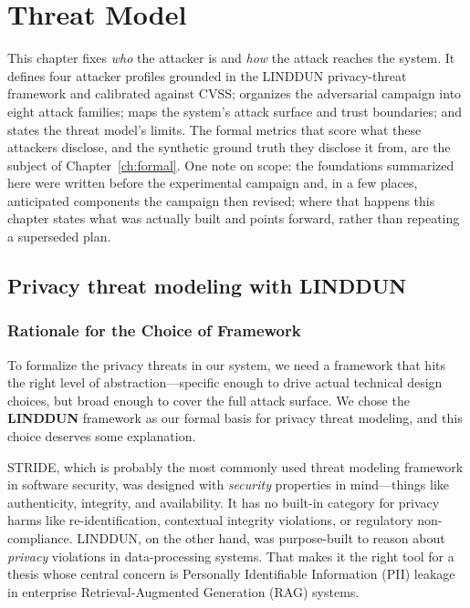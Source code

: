 \chapter{Threat Model}
\label{ch:threat}

This chapter fixes \emph{who} the attacker is and \emph{how} the attack reaches the system. It
defines four attacker profiles grounded in the LINDDUN privacy-threat framework and calibrated
against CVSS; organizes the adversarial campaign into eight attack families; maps the system's
attack surface and trust boundaries; and states the threat model's limits. The formal metrics
that score what these attackers disclose, and the synthetic ground truth they disclose it from,
are the subject of Chapter~\ref{ch:formal}. One note on scope: the foundations summarized here
were written before the experimental campaign and, in a few places, anticipated components the
campaign then revised; where that happens this chapter states what was actually built and points
forward, rather than repeating a superseded plan.

\section{Privacy threat modeling with LINDDUN}
\label{sec:ch3-linddun}

\subsection{Rationale for the Choice of Framework}

To formalize the privacy threats in our system, we need a framework that
hits the right level of abstraction---specific enough to drive actual
technical design choices, but broad enough to cover the full attack surface.
We chose the \textbf{LINDDUN} framework as our formal basis for privacy
threat modeling, and this choice deserves some explanation.

STRIDE, which is probably the most commonly used threat modeling framework
in software security, was designed with \emph{security} properties in
mind---things like authenticity, integrity, and availability. It has no
built-in category for privacy harms like re-identification, contextual
integrity violations, or regulatory non-compliance.
LINDDUN, on the other hand, was purpose-built to reason about
\emph{privacy} violations in data-processing systems. That makes it the
right tool for a thesis whose central concern is Personally Identifiable
Information (PII) leakage in enterprise Retrieval-Augmented Generation
(RAG) systems.

